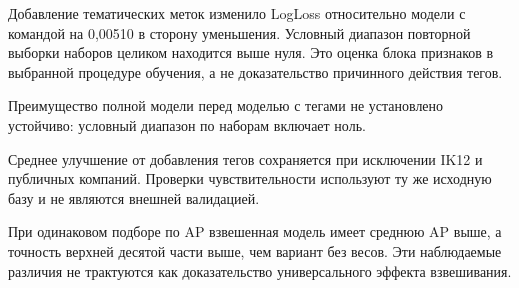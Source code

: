 Добавление тематических меток изменило LogLoss относительно модели с командой на 0,00510 в сторону уменьшения. Условный диапазон повторной выборки наборов целиком находится выше нуля. Это оценка блока признаков в выбранной процедуре обучения, а не доказательство причинного действия тегов.

Преимущество полной модели перед моделью с тегами не установлено устойчиво: условный диапазон по наборам включает ноль.

Среднее улучшение от добавления тегов сохраняется при исключении IK12 и публичных компаний. Проверки чувствительности используют ту же исходную базу и не являются внешней валидацией.

При одинаковом подборе по AP взвешенная модель имеет среднюю AP выше, а точность верхней десятой части выше, чем вариант без весов. Эти наблюдаемые различия не трактуются как доказательство универсального эффекта взвешивания.
